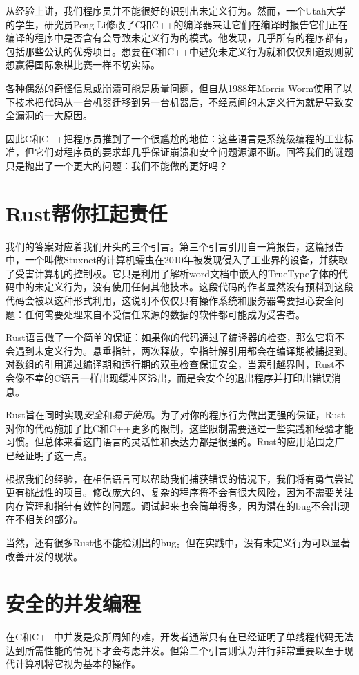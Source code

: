 从经验上讲，我们程序员并不能很好的识别出未定义行为。然而，一个Utah大学的学生，研究员Peng Li修改了C和C++的编译器来让它们在编译时报告它们正在编译的程序中是否含有会导致未定义行为的模式。他发现，几乎所有的程序都有，包括那些公认的优秀项目。想要在C和C++中避免未定义行为就和仅仅知道规则就想赢得国际象棋比赛一样不切实际。

各种偶然的奇怪信息或崩溃可能是质量问题，但自从1988年Morris Worm使用了以下技术把代码从一台机器迁移到另一台机器后，不经意间的未定义行为就是导致安全漏洞的一大原因。

因此C和C++把程序员推到了一个很尴尬的地位：这些语言是系统级编程的工业标准，但它们对程序员的要求却几乎保证崩溃和安全问题源源不断。回答我们的谜题只是抛出了一个更大的问题：我们不能做的更好吗？

\section{Rust帮你扛起责任}
我们的答案对应着我们开头的三个引言。第三个引言引用自一篇报告，这篇报告中，一个叫做Stuxnet的计算机蠕虫在2010年被发现侵入了工业界的设备，并获取了受害计算机的控制权。它只是利用了解析word文档中嵌入的TrueType字体的代码中的未定义行为，没有使用任何其他技术。这段代码的作者显然没有预料到这段代码会被以这种形式利用，这说明不仅仅只有操作系统和服务器需要担心安全问题：任何需要处理来自不受信任来源的数据的软件都可能成为受害者。

Rust语言做了一个简单的保证：如果你的代码通过了编译器的检查，那么它将不会遇到未定义行为。悬垂指针，两次释放，空指针解引用都会在编译期被捕捉到。对数组的引用通过编译期和运行期的双重检查保证安全，当索引越界时，Rust不会像不幸的C语言一样出现缓冲区溢出，而是会安全的退出程序并打印出错误消息。

Rust旨在同时实现\emph{安全}和\emph{易于使用}。为了对你的程序行为做出更强的保证，Rust对你的代码施加了比C和C++更多的限制，这些限制需要通过一些实践和经验才能习惯。但总体来看这门语言的灵活性和表达力都是很强的。Rust的应用范围之广已经证明了这一点。

根据我们的经验，在相信语言可以帮助我们捕获错误的情况下，我们将有勇气尝试更有挑战性的项目。修改庞大的、复杂的程序将不会有很大风险，因为不需要关注内存管理和指针有效性的问题。调试起来也会简单得多，因为潜在的bug不会出现在不相关的部分。

当然，还有很多Rust也不能检测出的bug。但在实践中，没有未定义行为可以显著改善开发的现状。

\section{安全的并发编程}
在C和C++中并发是众所周知的难，开发者通常只有在已经证明了单线程代码无法达到所需性能的情况下才会考虑并发。但第二个引言则认为并行非常重要以至于现代计算机将它视为基本的操作。

